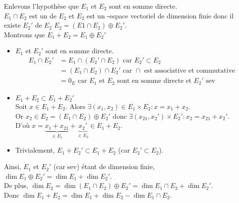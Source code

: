 \documentclass{article}
\begin{document}
\begin{question_kholle}
		Enlevons l'hypothèse que $E_1$ et $E_2$ sont en somme directe. \\
		$E_1 \cap E_2$ est un \sev de $E_2$ et $E_2$ est un \K-espace vectoriel de dimension finie donc il existe $E_2'$ \sev de $E_2$ \tq $E_2 = (E1 \cap E_2) \oplus E_2'$. \\
		Montrons que $E_1 + E_2 = E_1 \oplus E_2'$
		\begin{itemize}[label=$*$]
			\item $E_1$ et $E_2'$ sont en somme directe. \\
			\begin{equation*}
				\begin{aligned}
					E_1 \cap E_2' &= E_1 \cap \left( E_2' \cap E_2 \right) \text{ car } E_2' \subset E_2 \\
					&= \left( E_1 \cap E_2 \right) \cap E_2' \text{ car } \cap \text{ est associative et commutative} \\
					&= {0_E} \text{ car $E_1$ et $E_2$ sont en somme directe et $E_2'$ sev}
				\end{aligned}
			\end{equation*}
			\item $E_1 + E_2 \subset E_1 + E_2'$ \\
			Soit $x \in E_1 + E_2$.
			Alors $\exists (x_1, x_2) \in E_1 \times E_2 : x = x_1 + x_2$. \\
			Or $x_2 \in E_2 = \left( E_1 \cap E_2 \right) \oplus E_2'$ donc $\exists (x_{21}, x_2') \times E_2' : x_2 = x_{21} + x_2'$. \\
			D'où $x = \underbrace{x_1 + x_{21}}_{\in E_1} + \underbrace{x_2'}_{\in E_2} \in E_1 + E_2$.
			\item Trivialement, $E_1 + E_2' \subset E_1 + E_2$ (car $E_2' \subset E_2$). 
		\end{itemize}
		
		Ainsi, $E_1$ et $E_2'$ (car sev) étant de dimension finie, $\dim E_1 \oplus E_2' = \dim E_1 + \dim E_2'$. \\
		De plus, $\dim E_2 = \dim (E_1 \cap E_2) \oplus E_2' = \dim E_1 \cap E_2 + \dim E_2'$. \\
		Donc $\dim E_1 + E_2 = \dim E_1 + \dim E_2 - \dim E_1 \cap E_2$.
	\end{question_kholle}
\end{document}
